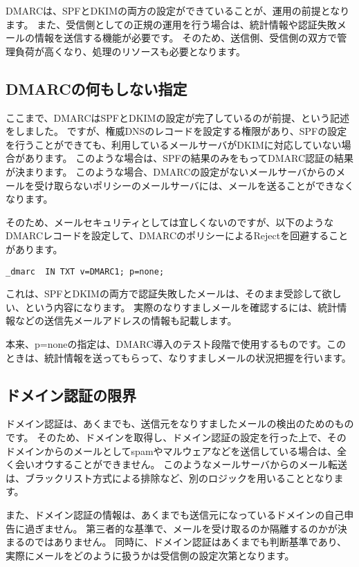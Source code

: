 DMARCは、SPFとDKIMの両方の設定ができていることが、運用の前提となります。
また、受信側としての正規の運用を行う場合は、統計情報や認証失敗メールの情報を送信する機能が必要です。
そのため、送信側、受信側の双方で管理負荷が高くなり、処理のリソースも必要となります。

\subsection{DMARCの何もしない指定}

ここまで、DMARCはSPFとDKIMの設定が完了しているのが前提、という記述をしました。
ですが、権威DNSのレコードを設定する権限があり、SPFの設定を行うことができても、利用しているメールサーバがDKIMに対応していない場合があります。
このような場合は、SPFの結果のみをもってDMARC認証の結果が決まります。
このような場合、DMARCの設定がないメールサーバからのメールを受け取らないポリシーのメールサーバには、メールを送ることができなくなります。

そのため、メールセキュリティとしては宜しくないのですが、以下のようなDMARCレコードを設定して、DMARCのポリシーによるRejectを回避することがあります。

\begin{verbatim}
_dmarc  IN TXT v=DMARC1; p=none;
\end{verbatim}

これは、SPFとDKIMの両方で認証失敗したメールは、そのまま受診して欲しい、という内容になります。
実際のなりすましメールを確認するには、統計情報などの送信先メールアドレスの情報も記載します。

本来、p=noneの指定は、DMARC導入のテスト段階で使用するものです。このときは、統計情報を送ってもらって、なりすましメールの状況把握を行います。

\subsection{ドメイン認証の限界}

ドメイン認証は、あくまでも、送信元をなりすましたメールの検出のためのものです。
そのため、ドメインを取得し、ドメイン認証の設定を行った上で、そのドメインからのメールとしてspamやマルウェアなどを送信している場合は、全く会いオウすることができません。
このようなメールサーバからのメール転送は、ブラックリスト方式による排除など、別のロジックを用いることとなります。

また、ドメイン認証の情報は、あくまでも送信元になっているドメインの自己申告に過ぎません。
第三者的な基準で、メールを受け取るのか隔離するのかが決まるのではありません。
同時に、ドメイン認証はあくまでも判断基準であり、実際にメールをどのように扱うかは受信側の設定次第となります。
